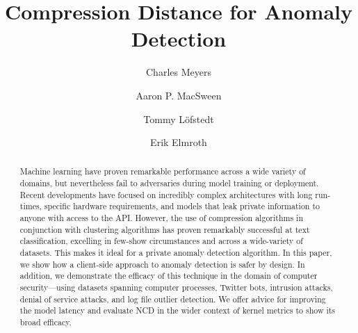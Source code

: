 \documentclass[sigconf]{acmart}
\begin{document}
\title{Compression Distance for Anomaly Detection}

\author{Charles Meyers}
\author{Aaron P. MacSween}
\author{Tommy Löfstedt}
\author{Erik Elmroth}


\begin{abstract}
  Machine learning have proven remarkable performance across a wide variety of domains, but nevertheless fail to adversaries during model training or deployment. 
  Recent developments have focused on incredibly complex architectures with long run-times, specific hardware requirements, and models that leak private information to anyone with access to the API. 
  However, the use of compression algorithms in conjunction with clustering algorithms has proven remarkably successful at text classification, excelling in few-show circumstances and across a wide-variety of datasets. This makes it ideal for a private anomaly detection algorithm. In this paper, we show how a client-side approach to anomaly detection is safer by design.
  In addition, we demonstrate the efficacy of this technique in the domain of computer security---using datasets spanning computer processes, Twitter bots, intrusion attacks, denial of service attacks, and log file outlier detection.
  We offer advice for improving the model latency and evaluate NCD in the wider context of kernel metrics to show its broad efficacy.
    
\end{abstract}


\end{document}
